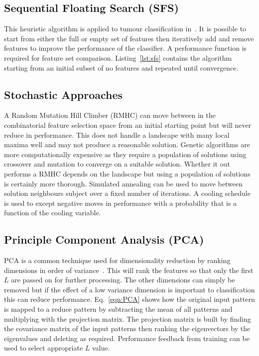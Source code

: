 \documentclass[journal]{IEEEtran}
\begin{document}
\subsection{Sequential Floating Search (SFS)}

This heuristic algorithm is applied to tumour classification in~\cite{hau07feat}.
It is possible to start from either the full or empty set of features then iteratively add and remove features to improve the performance of the classifier. 
A performance function is required for feature set comparison. 
Listing~\ref{lst:sfs} contains the algorithm starting from an initial subset of no features and repeated until convergence.





\subsection{Stochastic Approaches}
A Random Mutation Hill Climber (RMHC) can move between in the combinatorial feature selection space from an initial starting point but will never reduce in performance.  
This does not handle a landscape with many local maxima well and may not produce a reasonable solution.
Genetic algorithms are more computationally expensive as they require a population of solutions using crossover and mutation to converge on a suitable solution.   
Whether it out performs a RMHC depends on the landscape but using a population of solutions is certainly more thorough.    
Simulated annealing can be used to move between solution neighbours subject over a fixed number of iterations.
A cooling schedule is used to except negative moves in performance with a probability that is a function of the cooling variable. 


\subsection{Principle Component Analysis (PCA)}
PCA is a common technique used for dimensionality reduction by ranking dimensions in order of variance~\cite{pearson01pca}.
This will rank the features so that only the first $L$ are passed on for further processing. 
The other dimensions can simply be removed but if the effect of a low variance dimension is important to classification this can reduce performance.
Eq.~\eqref{eqn:PCA} shows how the original input pattern is mapped to a reduce pattern by subtracting the mean of all patterns and multiplying with the projection matrix.
The projection matrix is built by finding the covariance matrix of the input patterns then ranking the eigenvectors by the eigenvalues and deleting as required.
Performance feedback from training can be used to select appropriate $L$ value.
\end{document}
